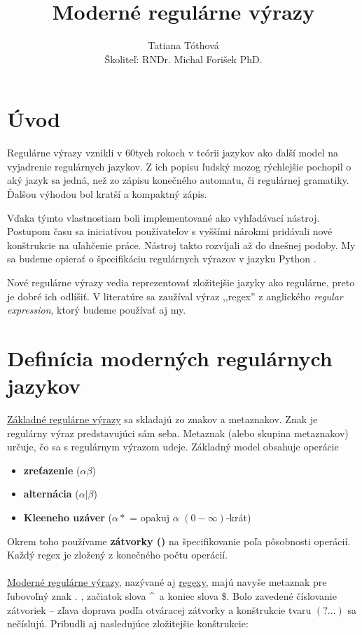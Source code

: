 \documentclass[myposter,portrait,plainboxedsections]{sciposter}
\def\mysection#1{
{\color{sectionCol}\section*{\sc\bfseries #1}}}
\begin{document}
\setlength{\logowidth}{20cm}
\setlength{\titlewidth}{\textwidth}
\addtolength{\titlewidth}{-\logowidth}
\useleftlogofalse

\color{textCol}

\title{Moderné regulárne výrazy}
\author{Tatiana Tóthová\\
        Školiteľ: RNDr. Michal Forišek PhD.}
\maketitle

\begin{multicols*}{3}

\mysection{Úvod}

Regulárne výrazy vznikli v 60tych rokoch v teórii jazykov ako ďalší model na vyjadrenie regulárnych jazykov. Z ich popisu ľudský mozog rýchlejšie pochopil o aký jazyk sa jedná, než zo zápisu konečného automatu, či regulárnej gramatiky. Ďalšou výhodou bol kratší a kompaktný zápis.

Vďaka týmto vlastnostiam boli implementované ako vyhľadávací nástroj. Postupom času sa iniciatívou používateľov s vyššími nárokmi pridávali nové konštrukcie na uľahčenie práce. Nástroj takto rozvíjali až do dnešnej podoby. My sa budeme opierať o špecifikáciu regulárnych výrazov v jazyku Python \cite{Python3Documentation}.

Nové regulárne výrazy vedia reprezentovať zložitejšie jazyky ako regulárne, preto je dobré ich odlíšiť. V literatúre sa zaužíval výraz ,,regex'' z anglického \textit{regular expression}, ktorý budeme používať aj my.

\mysection{Definícia moderných regulárnych jazykov}

\underline{Základné regulárne výrazy} sa skladajú zo znakov a metaznakov. Znak je regulárny výraz predstavujúci sám seba. Metaznak (alebo skupina metaznakov) určuje, čo sa s regulárnym výrazom udeje. Základný model obsahuje operácie
\begin{itemize}
\item \textbf{zreťazenie} ($\alpha\beta$)
\item \textbf{alternácia} ($\alpha|\beta$) 
\item \textbf{Kleeneho uzáver} ($\alpha*$ = opakuj $\alpha$ $(0-\infty)$-krát)
\end{itemize}
Okrem toho používame \textbf{zátvorky ()} na špecifikovanie poľa pôsobnosti operácií. Každý regex je zložený z konečného počtu operácií.
\\ \\
\underline{Moderné regulárne výrazy}, nazývané aj \underline{regexy}, majú navyše metaznak pre ľubovoľný znak . , začiatok slova \textasciicircum ~a koniec slova \$. Bolo zavedené číslovanie zátvoriek -- zľava doprava podľa otváracej zátvorky a konštrukcie tvaru $(?\dots)$ sa nečíslujú. Pribudli aj nasledujúce zložitejšie konštrukcie:


\end{multicols*}
\end{document}
